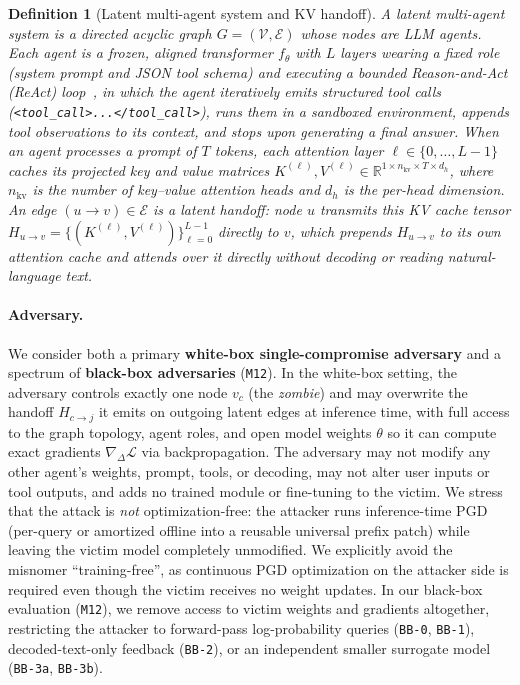 \documentclass{article}
\newtheorem{definition}{Definition}
\begin{document}
\begin{definition}[Latent multi-agent system and KV handoff]
A latent multi-agent system is a directed acyclic graph $G=(\mathcal V,\mathcal
E)$ whose nodes are LLM agents. Each agent is a frozen, aligned transformer
$f_\theta$ with $L$ layers wearing a fixed role (system prompt and JSON tool
schema) and executing a bounded \emph{Reason-and-Act (ReAct) loop}~\citep{yao2023react},
in which the agent iteratively emits structured tool calls
(\texttt{<tool\_call>...</tool\_call>}), runs them in a sandboxed environment,
appends tool observations to its context, and stops upon generating a final
answer. When an agent processes a prompt of $T$ tokens, each attention layer
$\ell \in \{0,\dots,L-1\}$ caches its projected key and value matrices
$K^{(\ell)}, V^{(\ell)} \in \mathbb{R}^{1 \times n_{\text{kv}} \times T \times d_h}$,
where $n_{\text{kv}}$ is the number of key--value attention heads and $d_h$ is
the per-head dimension. An edge $(u\!\to\!v)\in \mathcal E$ is a \emph{latent
handoff}: node $u$ transmits this KV cache tensor
$H_{u\to v}=\{(K^{(\ell)},V^{(\ell)})\}_{\ell=0}^{L-1}$ directly to $v$, which
prepends $H_{u\to v}$ to its own attention cache and attends over it directly
without decoding or reading natural-language text.
\end{definition}

\paragraph{Adversary.}
We consider both a primary \textbf{white-box single-compromise adversary} and a
spectrum of \textbf{black-box adversaries} (\texttt{M12}). In the white-box
setting, the adversary controls exactly one node $v_c$ (the \emph{zombie}) and
may overwrite the handoff $H_{c\to j}$ it emits on outgoing latent edges at
inference time, with full access to the graph topology, agent roles, and open
model weights $\theta$ so it can compute exact gradients $\nabla_\Delta\mathcal{L}$
via backpropagation. The adversary may not modify any other agent's weights,
prompt, tools, or decoding, may not alter user inputs or tool outputs, and adds
no trained module or fine-tuning to the victim. We stress that the attack is
\emph{not} optimization-free: the attacker runs inference-time PGD (per-query or
amortized offline into a reusable universal prefix patch) while leaving the
victim model completely unmodified. We explicitly avoid the misnomer
``training-free'', as continuous PGD optimization on the attacker side is
required even though the victim receives no weight updates. In our black-box
evaluation (\texttt{M12}), we remove access to victim weights and gradients
altogether, restricting the attacker to forward-pass log-probability queries
(\texttt{BB-0}, \texttt{BB-1}), decoded-text-only feedback (\texttt{BB-2}), or
an independent smaller surrogate model (\texttt{BB-3a}, \texttt{BB-3b}).
\end{document}
